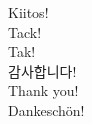 \documentclass[
  9pt
  , table
  , ignorenonframetext
]{beamer}
\begin{document}


\begin{frame}[plain]
  \begin{center}
    {\LARGE Kiitos!}  \\\vspace{6mm}
    {\LARGE Tack!}  \\\vspace{6mm}
    {\LARGE Tak!}  \\\vspace{6mm}
    {\LARGE 감사합니다!}\\\vspace{6mm}
    {\LARGE Thank you!}  \\\vspace{6mm}
    {\LARGE Dankesch\"on!} \\\vspace{6mm}
    {\LARGE \smiley } 
  \end{center}
  
\end{frame}
\end{document}
